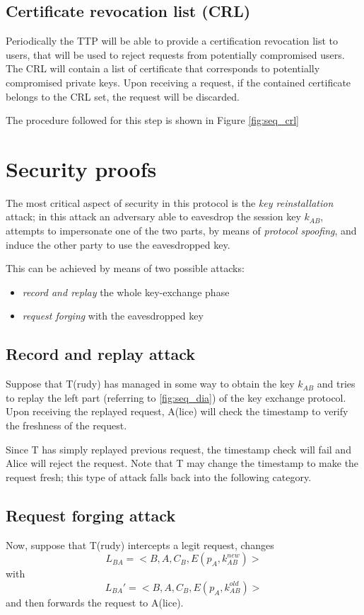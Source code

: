 \documentclass[twocolumn]{article}
\begin{document}
\subsection{Certificate revocation list (CRL)} Periodically the TTP will be able to provide a certification revocation list to users, that will be used to reject requests from potentially compromised users. The CRL will contain a list of certificate that corresponds to potentially compromised private keys. Upon receiving a request, if the contained certificate belongs to the CRL set, the request will be discarded.

The procedure followed for this step is shown in Figure \ref{fig:seq_crl}
\section{Security proofs}
The most critical aspect of security in this protocol is the \textit{key reinstallation} attack; in this attack an adversary able to eavesdrop the session key $k_{AB}$, attempts to impersonate one of the two parts, by means of \textit{protocol spoofing}, and induce the other party to use the eavesdropped key.

This can be achieved by means of two possible attacks:
\begin{itemize}
	\item \textit{record and replay} the whole key-exchange phase
	\item \textit{request forging} with the eavesdropped key
\end{itemize}
\subsection{Record and replay attack}
Suppose that T(rudy) has managed in some way to obtain the key $k_{AB}$ and tries to replay the left part (referring to \ref{fig:seq_dia}) of the key exchange protocol.
Upon receiving the replayed request, A(lice) will check the timestamp to verify the freshness of the request. 

Since T has simply replayed previous request, the timestamp check will fail and Alice will reject the request. Note that T may change the timestamp to make the request fresh; 
this type of attack falls back into the following category.
\subsection{Request forging attack}
Now, suppose that T(rudy) intercepts a legit request, changes \[L_{BA} = <B,A,C_B,E(p_A,k^{new}_{AB})>\] 
with \[L_{BA}' = <B,A,C_B,E(p_A,k^{old}_{AB})>\] 
and then forwards the
request to A(lice).
\end{document}
